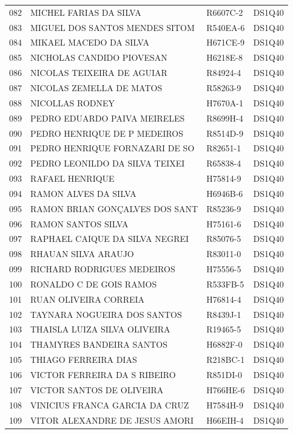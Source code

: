 \documentclass[
]{book}
\begin{document}
\begin{longtable}[]{@{}llll@{}}
082 & MICHEL FARIAS DA SILVA & R6607C-2 & DS1Q40 \\
083 & MIGUEL DOS SANTOS MENDES SITOM & R540EA-6 & DS1Q40 \\
084 & MIKAEL MACEDO DA SILVA & H671CE-9 & DS1Q40 \\
085 & NICHOLAS CANDIDO PIOVESAN & H6218E-8 & DS1Q40 \\
086 & NICOLAS TEIXEIRA DE AGUIAR & R84924-4 & DS1Q40 \\
087 & NICOLAS ZEMELLA DE MATOS & R58263-9 & DS1Q40 \\
088 & NICOLLAS RODNEY & H7670A-1 & DS1Q40 \\
089 & PEDRO EDUARDO PAIVA MEIRELES & R8699H-4 & DS1Q40 \\
090 & PEDRO HENRIQUE DE P MEDEIROS & R8514D-9 & DS1Q40 \\
091 & PEDRO HENRIQUE FORNAZARI DE SO & R82651-1 & DS1Q40 \\
092 & PEDRO LEONILDO DA SILVA TEIXEI & R65838-4 & DS1Q40 \\
093 & RAFAEL HENRIQUE & H75814-9 & DS1Q40 \\
094 & RAMON ALVES DA SILVA & H6946B-6 & DS1Q40 \\
095 & RAMON BRIAN GONÇALVES DOS SANT & R85236-9 & DS1Q40 \\
096 & RAMON SANTOS SILVA & H75161-6 & DS1Q40 \\
097 & RAPHAEL CAIQUE DA SILVA NEGREI & R85076-5 & DS1Q40 \\
098 & RHAUAN SILVA ARAUJO & R83011-0 & DS1Q40 \\
099 & RICHARD RODRIGUES MEDEIROS & H75556-5 & DS1Q40 \\
100 & RONALDO C DE GOIS RAMOS & R533FB-5 & DS1Q40 \\
101 & RUAN OLIVEIRA CORREIA & H76814-4 & DS1Q40 \\
102 & TAYNARA NOGUEIRA DOS SANTOS & R8439J-1 & DS1Q40 \\
103 & THAISLA LUIZA SILVA OLIVEIRA & R19465-5 & DS1Q40 \\
104 & THAMYRES BANDEIRA SANTOS & H6882F-0 & DS1Q40 \\
105 & THIAGO FERREIRA DIAS & R218BC-1 & DS1Q40 \\
106 & VICTOR FERREIRA DA S RIBEIRO & R851DI-0 & DS1Q40 \\
107 & VICTOR SANTOS DE OLIVEIRA & H766HE-6 & DS1Q40 \\
108 & VINICIUS FRANCA GARCIA DA CRUZ & H7584H-9 & DS1Q40 \\
109 & VITOR ALEXANDRE DE JESUS AMORI & H66EIH-4 & DS1Q40 \\

\end{longtable}
\end{document}
